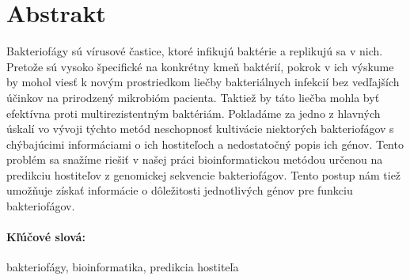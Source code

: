 \documentclass[12pt, oneside]{book}
\begin{document}

\newpage
\section*{Abstrakt}

Bakteriofágy sú vírusové častice, ktoré infikujú baktérie a replikujú sa v nich. Pretože sú vysoko špecifické na konkrétny kmeň baktérií, pokrok v ich výskume by mohol viesť k novým prostriedkom liečby bakteriálnych infekcií bez vedľajších účinkov na prirodzený mikrobióm pacienta. Taktiež by táto liečba mohla byť efektívna proti multirezistentným baktériám. Pokladáme za jedno z hlavných úskalí vo vývoji týchto metód neschopnosť kultivácie niektorých bakteriofágov s chýbajúcimi informáciami o ich hostiteľoch a nedostatočný popis ich génov. Tento problém sa snažíme riešiť v našej práci bioinformatickou metódou určenou na predikciu hostiteľov z genomickej sekvencie bakteriofágov. Tento postup nám tiež umožňuje získať informácie o dôležitosti jednotlivých génov pre funkciu bakteriofágov.

\paragraph*{Kľúčové slová:} bakteriofágy, bioinformatika, predikcia hostiteľa

%
%



\newpage 

\tableofcontents



\newpage 

\listoffigures
\listoftables
\end{document}
